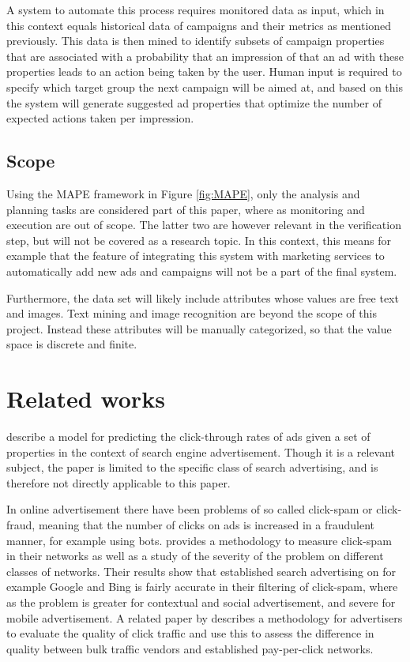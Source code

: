 \documentclass[10pt,twocolumn]{article}
\begin{document}
A system to automate this process requires monitored data as input, which in this context equals historical data of campaigns and their metrics as mentioned previously. This data is then mined to identify subsets of campaign properties that are associated with a probability that an impression of that an ad with these properties leads to an action being taken by the user. Human input is required to specify which target group the next campaign will be aimed at, and based on this the system will generate suggested ad properties that optimize the number of expected actions taken per impression.

\subsection{Scope}
Using the MAPE framework in Figure \ref{fig:MAPE}, only the analysis and planning tasks are considered part of this paper, where as monitoring and execution are out of scope. The latter two are however relevant in the verification step, but will not be covered as a research topic. In this context, this means for example that the feature of integrating this system with marketing services to automatically add new ads and campaigns will not be a part of the final system.

Furthermore, the data set will likely include attributes whose values are free text and images. Text mining and image recognition are beyond the scope of this project. Instead these attributes will be manually categorized, so that the value space is discrete and finite.

\section{Related works}
\citet{Richardson2007} describe a model for predicting the click-through rates of ads given a set of properties in the context of search engine advertisement. Though it is a relevant subject, the paper is limited to the specific class of search advertising, and is therefore not directly applicable to this paper.

In online advertisement there have been problems of so called click-spam or click-fraud, meaning that the number of clicks on ads is increased in a fraudulent manner, for example using bots. \citet{Dave2012} provides a methodology to measure click-spam in their networks as well as a study of the severity of the problem on different classes of networks. Their results show that established search advertising on for example Google and Bing is fairly accurate in their filtering of click-spam, where as the problem is  greater for contextual and social advertisement, and severe for mobile advertisement. A related paper by \citet{Zhang2011} describes a methodology for advertisers to evaluate the quality of click traffic and use this to assess the difference in quality between bulk traffic vendors and established pay-per-click networks.
\end{document}
